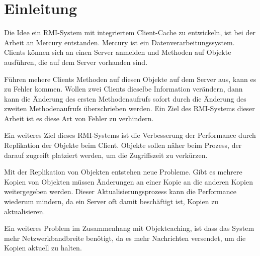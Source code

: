 \chapter{Einleitung}

Die Idee ein RMI-System mit integriertem Client-Cache zu entwickeln, ist bei der Arbeit an Mercury entstanden. Mercury ist ein Datenverarbeitungssystem. Clients können sich an einen Server anmelden und Methoden auf Objekte ausführen, die auf dem Server vorhanden sind. 

Führen mehere Clients Methoden auf diesen Objekte auf dem Server aus, kann es zu Fehler kommen. Wollen zwei Clients dieselbe Information verändern, dann kann die Änderung des ersten Methodenaufrufs sofort durch die Änderung des zweiten Methodenaufrufs überschrieben werden. Ein Ziel des RMI-Systems dieser Arbeit ist es diese Art von Fehler zu verhindern.

 Ein weiteres Ziel dieses RMI-Systems ist die Verbesserung der Performance durch Replikation der Objekte beim Client. Objekte sollen näher beim Prozess, der darauf zugreift platziert werden, um die Zugriffszeit zu verkürzen.

Mit der Replikation von Objekten entstehen neue Probleme. Gibt es mehrere Kopien von Objekten müssen Änderungen an einer Kopie an die anderen Kopien weitergegeben werden. Dieser Aktualisierungsprozess kann die Performance wiederum mindern, da ein Server oft damit beschäftigt ist, Kopien zu aktualisieren.

Ein weiteres Problem im Zusammenhang mit Objektcaching, ist dass das System mehr Netzwerkbandbreite benötigt, da es mehr Nachrichten versendet, um die Kopien aktuell zu halten.